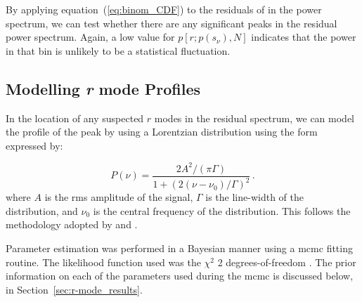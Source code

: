 By applying equation~(\ref{eq:binom_CDF}) to the residuals of in the power spectrum, we can test whether there are any significant peaks in the residual power spectrum. Again, a low value for $p[r; p(s_\nu), N]$ indicates that the power in that bin is unlikely to be a statistical fluctuation.


%
%



\subsection{Modelling {\it r} mode Profiles}
In the location of any suspected $r$ modes in the residual spectrum, we can model the profile of the peak by using a Lorentzian distribution using the form expressed by:

\begin{equation}
P(\nu) = \frac{2A^2/(\pi \Gamma)}{1 + (2(\nu - \nu_0)/\Gamma)^2} \, .
\label{eq:lorentzian}
\end{equation}
%
where $A$ is the \gls{rms} amplitude of the signal, $\Gamma$ is the line-width of the distribution, and $\nu_0$ is the central frequency of the distribution. This follows the methodology adopted by \citet{loptien_global-scale_2018} and \citet{liang_time-distance_2019}. %

Parameter estimation was performed in a Bayesian manner using a \gls{mcmc} fitting routine. The likelihood function used was the $\chi^2$ 2 degrees-of-freedom \citep{handberg_bayesian_2011, davies_low-frequency_2014}. The prior information on each of the parameters used during the \gls{mcmc} is discussed below, in Section~\ref{sec:r-mode_results}.

